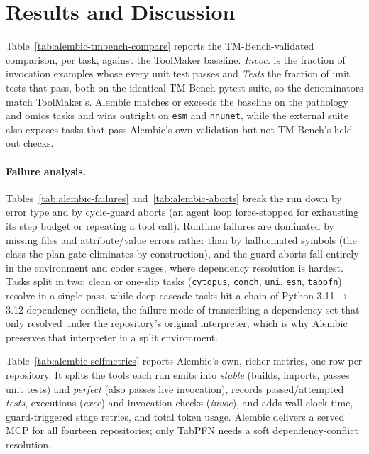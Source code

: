 \section{Results and Discussion}
\label{sec:results}






Table~\ref{tab:alembic-tmbench-compare} reports the TM-Bench-validated
comparison, per task, against the ToolMaker baseline. \emph{Invoc.} is the
fraction of invocation examples whose every unit test passes and \emph{Tests}
the fraction of unit tests that pass, both on the identical TM-Bench pytest
suite, so the denominators match ToolMaker's. Alembic matches or exceeds the
baseline on the pathology and omics tasks and wins outright on \texttt{esm} and
\texttt{nnunet}, while the external suite also exposes tasks that pass Alembic's
own validation but not TM-Bench's held-out checks.

\paragraph{Failure analysis.} Tables~\ref{tab:alembic-failures}
and~\ref{tab:alembic-aborts} break the run down by error type and by cycle-guard
aborts (an agent loop force-stopped for exhausting its step budget or repeating a
tool call). Runtime failures are dominated by missing files and attribute/value
errors rather than by hallucinated symbols (the class the plan gate eliminates
by construction), and the guard aborts fall entirely in the environment and
coder stages, where dependency resolution is hardest. Tasks split in two: clean
or one-slip tasks (\texttt{cytopus}, \texttt{conch}, \texttt{uni}, \texttt{esm},
\texttt{tabpfn}) resolve in a single pass, while deep-cascade tasks hit a chain of
Python-3.11$\to$3.12 dependency conflicts, the failure mode of transcribing a
dependency set that only resolved under the repository's original interpreter,
which is why Alembic preserves that interpreter in a split environment.

Table~\ref{tab:alembic-selfmetrics} reports Alembic's own, richer metrics, one
row per repository. It splits the tools each run emits into \emph{stable} (builds,
imports, passes unit tests) and \emph{perfect} (also passes live invocation),
records passed/attempted \emph{tests}, executions (\emph{exec}) and invocation
checks (\emph{invoc}), and adds wall-clock time, guard-triggered stage retries,
and total token usage. Alembic delivers a served MCP for all fourteen
repositories; only TabPFN needs a soft dependency-conflict resolution.


